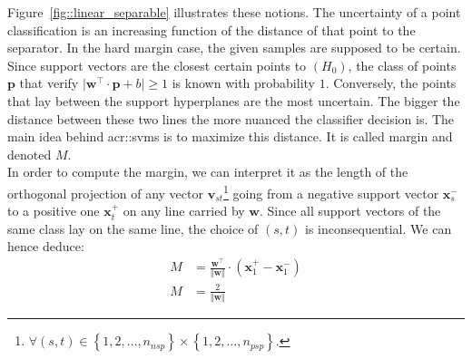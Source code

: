                 Figure~\ref{fig::linear_separable} illustrates these notions.
                The uncertainty of a point classification is an increasing function of the distance of that point to the separator.
                In the hard margin case, the given samples are supposed to be certain.
                Since support vectors are the closest certain points to $(H_0)$, the class of points $\bm{p}$ that verify $\vert\bm{w}^\intercal\cdot\bm{p} + b\vert \geq 1$ is known with probability $1$.
                Conversely, the points that lay between the support hyperplanes are the most uncertain.
                The bigger the distance between these two lines the more nuanced the classifier decision is.
                The main idea behind \glspl{acr::svm} is to maximize this distance.
                It is called margin and denoted $M$.\\

                In order to compute the margin, we can interpret it as the length of the orthogonal projection of any vector $\bm{v}_{st}$\footnote{$\forall (s, t) \in \left\{1,2,\dots,n_{nsp}\right\} \times \left\{1,2,\dots,n_{psp}\right\}$.} going from a negative support vector $\bm{x}^-_s$ to a positive one $\bm{x}^+_t$ on any line carried by $\bm{w}$.
                Since all support vectors of the same class lay on the same line, the choice of $(s,t)$ is inconsequential.
                We can hence deduce:
                \begin{align}
                    M &= \frac{\bm{w}^\intercal}{\Vert\bm{w}\Vert} \cdot (\bm{x}^+_1 - \bm{x}^-_1) \nonumber \\
                    M &= \frac{2}{\Vert\bm{w}\Vert}
                \end{align}


